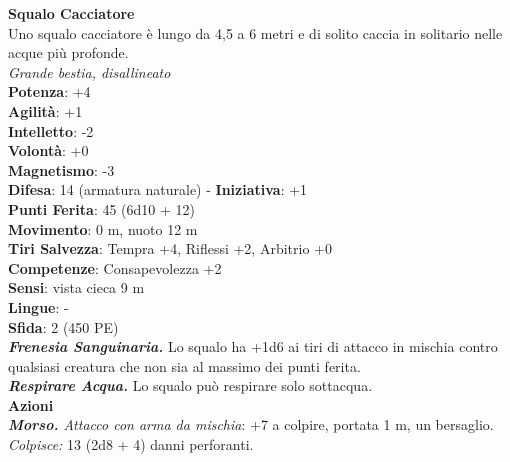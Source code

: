 \begin{multicols}{2}
\medskip\textbf{Squalo Cacciatore}\\
Uno squalo cacciatore è lungo da 4,5 a 6 metri e di solito caccia in solitario nelle acque più profonde.\\
\emph{Grande bestia, disallineato}\\
\textbf{Potenza}: +4\\
\textbf{Agilità}: +1\\
\textbf{Intelletto}: -2\\
\textbf{Volontà}: +0\\
\textbf{Magnetismo}: -3\\
\textbf{Difesa}: 14 (armatura naturale) - \textbf{Iniziativa}: +1\\
\textbf{Punti Ferita}: 45 (6d10 + 12)\\
\textbf{Movimento}: 0 m, nuoto 12 m\\
\textbf{Tiri Salvezza}: Tempra +4, Riflessi +2, Arbitrio +0\\
\textbf{Competenze}: Consapevolezza +2\\
\textbf{Sensi}: vista cieca 9 m\\
\textbf{Lingue}: -\\
\textbf{Sfida}: 2 (450 PE)\smallskip\\
\emph{\textbf{Frenesia Sanguinaria.}} Lo squalo ha +1d6 ai tiri di attacco in mischia contro qualsiasi creatura che non sia al massimo dei punti ferita.\\
\emph{\textbf{Respirare Acqua.}} Lo squalo può respirare solo sottacqua.\\
\smallskip\textbf{Azioni}\\
\emph{\textbf{Morso.} Attacco con arma da mischia}: +7 a colpire, portata 1 m, un bersaglio.\\
\emph{Colpisce:} 13 (2d8 + 4) danni perforanti.\\


\end{multicols}
